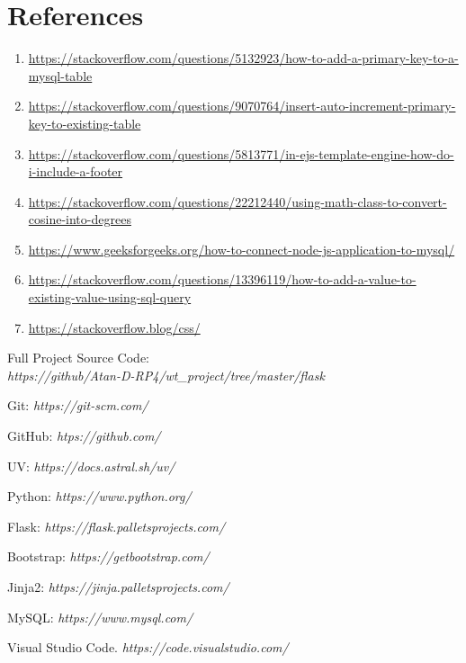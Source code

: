 \chapter{References}

\begin{enumerate}
  \item \raggedright
    \url{https://stackoverflow.com/questions/5132923/how-to-add-a-primary-key-to-a-mysql-table}
  \item \raggedright
    \url{https://stackoverflow.com/questions/9070764/insert-auto-increment-primary-key-to-existing-table}
  \item \raggedright
    \url{https://stackoverflow.com/questions/5813771/in-ejs-template-engine-how-do-i-include-a-footer}
  \item \raggedright
    \url{https://stackoverflow.com/questions/22212440/using-math-class-to-convert-cosine-into-degrees}
  \item \raggedright
    \url{https://www.geeksforgeeks.org/how-to-connect-node-js-application-to-mysql/}
  \item \raggedright
    \url{https://stackoverflow.com/questions/13396119/how-to-add-a-value-to-existing-value-using-sql-query}
  \item \raggedright \url{https://stackoverflow.blog/css/}
\end{enumerate}

\begin{thebibliography}{9}
  Full Project Source Code: \\
  \textit{https://github/Atan-D-RP4/wt\_project/tree/master/flask}

  Git: \textit{https://git-scm.com/}

  GitHub: \textit{htps://github.com/}

  UV: \textit{https://docs.astral.sh/uv/}

  Python: \textit{https://www.python.org/}

  Flask: \textit{https://flask.palletsprojects.com/}

  Bootstrap: \textit{https://getbootstrap.com/}

  Jinja2: \textit{https://jinja.palletsprojects.com/}

  MySQL: \textit{https://www.mysql.com/}

  Visual Studio Code. \textit{https://code.visualstudio.com/}
\end{thebibliography}
